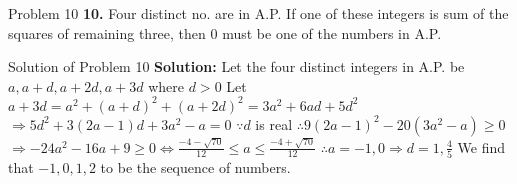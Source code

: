 \documentclass[aspectratio=1610,8pt]{beamer}
\begin{document}
\begin{frame}{Problem 10}
  \textbf{10.} Four distinct no. are in A.P. If one of these integers is sum of the squares of remaining three, then $0$ must be
  one of the numbers in A.P.
\end{frame}
\begin{frame}{Solution of Problem 10}
  \textbf{Solution:} Let the four distinct integers in A.P. be $a, a + d, a + 2d, a + 3d$ where $d > 0$
  \linebreak\linebreak
  Let $a + 3d = a^2 + (a + d)^2 + (a + 2d)^2 = 3a^2 + 6ad + 5d^2$
  \linebreak\linebreak
  $\Rightarrow 5d^2 + 3(2a - 1)d + 3a^2 -a = 0$
  \linebreak\linebreak
  $\because d$ is real $\therefore 9(2a - 1)^2 - 20(3a^2 - a)\geq 0$
  \linebreak\linebreak
  $\Rightarrow -24a^2 - 16a + 9 \geq 0 \Leftrightarrow \frac{-4 - \sqrt{70}}{12}\leq a \leq \frac{-4 + \sqrt{70}}{12}$
  \linebreak\linebreak
  $\therefore a = -1, 0 \Rightarrow d = 1, \frac{4}{5}$
  \linebreak\linebreak
  We find that $-1, 0, 1, 2$ to be the sequence of numbers.
\end{frame}
\end{document}
